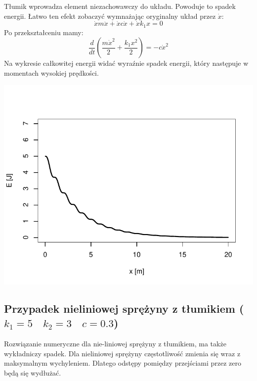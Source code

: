\documentclass[12pt]{sprawozdanie}
\begin{document}
Tłumik wprowadza element niezachowawczy do układu. Powoduje to spadek
energii. Łatwo ten efekt zobaczyć wymnażając oryginalny układ przez
\(\dot x\): \[\dot xm\ddot x + \dot xc\dot x + \dot xk_1x=0\] Po
przekształceniu mamy:
\[\frac{d}{dt}\left(\frac{m\dot x^2}{2}+\frac{k_1 x^2}{2}\right)=-c\dot x^2\]
Na wykresie całkowitej energii widać wyraźnie spadek energii, który
następuje w momentach wysokiej prędkości.

\begin{center}\includegraphics{info2_files/figure-latex/linear-dump-energy-1} \end{center}

\hypertarget{przypadek-nieliniowej-sprezyny-z-tumikiem-k_15quad-k_23quad-c0.3}{%
\subsection{\texorpdfstring{Przypadek nieliniowej sprężyny z tłumikiem
(\(k_1=5\quad k_2=3\quad c=0.3\))}{Przypadek nieliniowej sprężyny z tłumikiem (k\_1=5\textbackslash{}quad k\_2=3\textbackslash{}quad c=0.3)}}\label{przypadek-nieliniowej-sprezyny-z-tumikiem-k_15quad-k_23quad-c0.3}}

Rozwiązanie numeryczne dla nie-liniowej sprężyny z tłumikiem, ma także
wykładniczy spadek. Dla nieliniowej sprężyny częstotliwość zmienia się
wraz z maksymalnym wychyleniem. Dlatego odstępy pomiędzy przejściami
przez zero będą się wydłużać.
\end{document}
